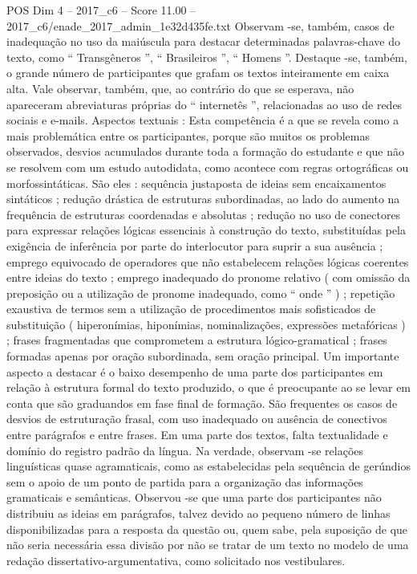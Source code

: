 \begin{textsample}{POS Dim 4 – 2017\_c6 – Score 11.00 – 2017\_c6/enade\_2017\_admin\_1e32d435fe.txt}
Observam -se, também, casos de inadequação no uso da maiúscula para destacar determinadas palavras-chave do texto, como “ Transgêneros ”, “ Brasileiros ”, “ Homens ”.
Destaque -se, também, o grande número de participantes que grafam os textos inteiramente em caixa alta.
Vale observar, também, que, ao contrário do que se esperava, não apareceram abreviaturas próprias do “ internetês ”, relacionadas ao uso de redes sociais e e-mails.
Aspectos textuais : Esta competência é a que se revela como a mais problemática entre os participantes, porque são muitos os problemas observados, desvios acumulados durante toda a formação do estudante e que não se resolvem com um estudo autodidata, como acontece com regras ortográficas ou morfossintáticas.
São eles : sequência justaposta de ideias sem encaixamentos sintáticos ; redução drástica de estruturas subordinadas, ao lado do aumento na frequência de estruturas coordenadas e absolutas ; redução no uso de conectores para expressar relações lógicas essenciais à construção do texto, substituídas pela exigência de inferência por parte do interlocutor para suprir a sua ausência ; emprego equivocado de operadores que não estabelecem relações lógicas coerentes entre ideias do texto ; emprego inadequado do pronome relativo ( com omissão da preposição ou a utilização de pronome inadequado, como “ onde ” ) ; repetição exaustiva de termos sem a utilização de procedimentos mais sofisticados de substituição ( hiperonímias, hiponímias, nominalizações, expressões metafóricas ) ; frases fragmentadas que comprometem a estrutura lógico-gramatical ; frases formadas apenas por oração subordinada, sem oração principal.
Um importante aspecto a destacar é o baixo desempenho de uma parte dos participantes em relação à estrutura formal do texto produzido, o que é preocupante ao se levar em conta que são graduandos em fase final de formação.
São frequentes os casos de desvios de estruturação frasal, com uso inadequado ou ausência de conectivos entre parágrafos e entre frases.
Em uma parte dos textos, falta textualidade e domínio do registro padrão da língua.
Na verdade, observam -se relações linguísticas quase agramaticais, como as estabelecidas pela sequência de gerúndios sem o apoio de um ponto de partida para a organização das informações gramaticais e semânticas.
Observou -se que uma parte dos participantes não distribuiu as ideias em parágrafos, talvez devido ao pequeno número de linhas disponibilizadas para a resposta da questão ou, quem sabe, pela suposição de que não seria necessária essa divisão por não se tratar de um texto no modelo de uma redação dissertativo-argumentativa, como solicitado nos vestibulares.

\end{textsample}
